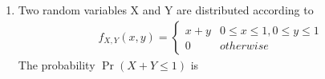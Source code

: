 \begin{enumerate}[label=\thesection.\arabic*.,ref=\thesection.\theenumi]
\item Two random variables X and Y are distributed according to
\begin{align}
 f_{X,Y}(x,y)=\begin{cases} 
      x+y & 0\leq x\leq 1, 0\leq y\leq 1 \\
      0 & otherwise
  \end{cases}
\end{align}
The probability $\Pr(X+Y\leq 1)$ is 
%
\solution

%



\end{enumerate}